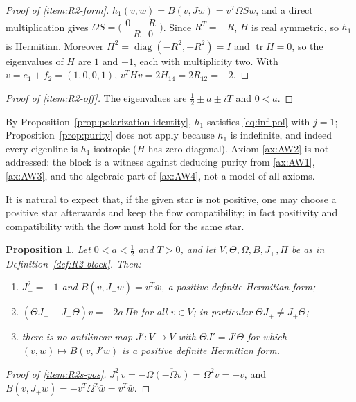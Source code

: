 \documentclass[11pt]{amsart}
\theoremstyle{plain}
\newtheorem{proposition}[theorem]{Proposition}
\theoremstyle{definition}
\theoremstyle{remark}
\numberwithin{equation}{section}
\DeclareMathOperator{\tr}{tr}
\DeclareMathOperator{\diag}{diag}
\begin{document}
\begin{proof}[Proof of \ref{item:R2-form}]
$h_1(v,w)=B(v,Jw)=v^T\Omega S\bar w$, and a direct multiplication gives
$\Omega S=\bigl(\begin{smallmatrix}0&R\\-R&0\end{smallmatrix}\bigr)$.
Since $R^T=-R$, $H$ is real symmetric, so $h_1$ is Hermitian. Moreover
$H^2=\diag(-R^2,-R^2)=I$ and $\tr H=0$, so the eigenvalues of $H$ are
$1$ and $-1$, each with multiplicity two. With $v=e_1+f_2=(1,0,0,1)$,
$v^THv=2H_{14}=2R_{12}=-2$.
\end{proof}

\begin{proof}[Proof of \ref{item:R2-off}]
The eigenvalues are $\tfrac12\pm a\pm iT$ and $0<a$.
\end{proof}

By Proposition~\ref{prop:polarization-identity}, $h_1$ satisfies
\eqref{eq:inf-pol} with $j=1$; Proposition~\ref{prop:purity} does not
apply because $h_1$ is indefinite, and indeed every eigenline is
$h_1$-isotropic ($H$ has zero diagonal). Axiom \ref{ax:AW2} is not
addressed: the block is a witness against deducing purity from
\ref{ax:AW1}, \ref{ax:AW3}, and the algebraic part of \ref{ax:AW4}, not a
model of all axioms.

It is natural to expect that, if the given star is not positive, one may
choose a positive star afterwards and keep the flow compatibility; in
fact positivity and compatibility with the flow must hold for the same
star.

\begin{proposition}\label{prop:R2-star}
Let $0<a<\tfrac12$ and $T>0$, and let $V,\Theta,\Omega,B,J_+,\Pi$ be
as in Definition~\ref{def:R2-block}. Then:
\begin{enumerate}[label=(\roman*)]
\item\label{item:R2s-pos} $J_+^2=-1$ and $B(v,J_+w)=v^T\bar w$, a
  positive definite Hermitian form;
\item\label{item:R2s-defect} $(\Theta J_+-J_+\Theta)v=-2a\,\Pi\bar v$
  for all $v\in V$; in particular $\Theta J_+\ne J_+\Theta$;
\item\label{item:R2s-none} there is no antilinear map $J':V\to V$ with
  $\Theta J'=J'\Theta$ for which $(v,w)\mapsto B(v,J'w)$ is a positive
  definite Hermitian form.
\end{enumerate}
\end{proposition}

\begin{proof}[Proof of \ref{item:R2s-pos}]
$J_+^2v=-\Omega\overline{(-\Omega\bar v)}=\Omega^2v=-v$, and
$B(v,J_+w)=-v^T\Omega^2\bar w=v^T\bar w$.
\end{proof}
\end{document}
